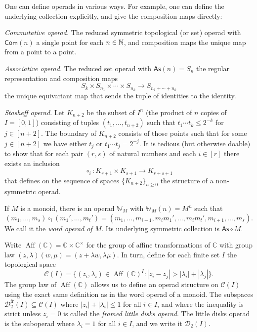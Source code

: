 One can define operads in various ways. For example,
one can define the underlying collection explicitly,
and give the composition maps directly:
\begin{tenumerate}
\item \emph{Commutative operad.} The reduced symmetric topological (or set)
operad with $\mathsf{Com}(n)$ a single point for each
$n\in \mathbb N$, and composition maps the unique
map from a point to a point.
\item \emph{Associative operad.} 
The reduced set operad with
$\mathsf{As}(n) = S_n$
the regular representation and composition maps
\[ S_k \times S_{n_1} \times
\cdots \times S_{n_k} \longrightarrow S_{n_1+\cdots+ n_k} \]
the unique equivariant map that sends the tuple
of identities to the identity.
\item  \emph{Stasheff operad.}
Let $K_{n+2}$ be the subset of $I^n$ (the
product of $n$ copies of $I=[0,1]$) 
consisting of tuples $(t_1,\ldots,t_{n+2})$
such that $t_1\cdots t_k\leqslant 2^{-k}$
for $j\in [n+2]$. The boundary of 
$K_{n+2}$ consists of those points such
that for some $j\in [n+2]$ we have
either $t_j$ or $t_1\cdots t_j = 2^{-j}$.
It is tedious (but otherwise doable)
to show that for each pair $(r,s)$ of
natural numbers and each $i\in [r]$
there exists an inclusion
\[ \circ_i : K_{r+1} \times K_{s+1} \longrightarrow
 	K_{r+s+1} \] 
that defines on the sequence of
spaces $\{K_{n+2}\}_{n\geqslant 0}$
the structure of a non-symmetric operad.

\item If $M$ is a monoid, there is an
operad $\mathbb W_M$ with $\mathbb{W}_M(n) =
M^n$ such that 
\[(m_1,\ldots,m_s) \circ_i (m_1',\ldots,m_t') = 
 	(m_1,\ldots,m_{i-1}, m_im_1',\ldots,m_im_t',m_{i+1},\ldots, m_s).\] We call it the
 \emph{word operad of $M$}. Its underlying
 symmetric collection is $\mathsf{As}\circ M$. 
 
 \item Write $\operatorname{Aff}(\mathbb C) = \mathbb{C}\times \mathbb{C}^\times$ for the group of affine transformations of
$\mathbb C$ with group law $(z,\lambda)(w,\mu) = (z+\lambda w,\lambda\mu)$. In turn, define for each finite set $I$ the topological space
\[ \mathcal{C}(I) = \{ (z_i,\lambda_i)\in \operatorname{Aff}(\mathbb C)^I  : |z_i-z_j|>|\lambda_i|+|\lambda_j| \}.\] 
The group law of $\operatorname{Aff}(\mathbb C)$ allows us to
define an operad structure on $\mathcal{C}(I)$ using the
exact same definition as in the word operad of a monoid. 
The subspaces $\mathcal{D}_2^{\mathrm{fr}}(I)
	\subseteq \mathcal{C}(I)$
where $|z_i|+|\lambda_i|\leqslant 1$ for all $i\in I$, and 
where the inequality is strict unless $z_i=0$ is called
the \emph{framed little disks operad}. The little disks operad
is the suboperad where $\lambda_i = 1$ for all $i\in I$, and 
we write it $\mathcal{D}_2(I)$.


\end{tenumerate}
